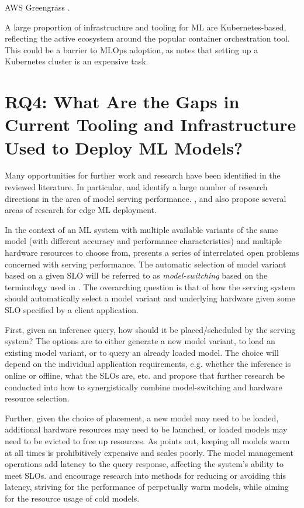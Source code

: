 AWS Greengrass \cite{Krishnamurthi2019}.

A large proportion of infrastructure and tooling for ML are Kubernetes-based, reflecting the active ecosystem around the popular container orchestration tool.
This could be a barrier to MLOps adoption, as \textcite{Ruf2021} notes that setting up a Kubernetes cluster is an expensive task.

\section{RQ4: What Are the Gaps in Current Tooling and Infrastructure Used to Deploy ML Models?}
\label{ch:research_results:rq4_gaps}

Many opportunities for further work and research have been identified in the reviewed literature.
In particular, \cite{Yadwadkar2019} and \cite{Zhang2020} identify a large number of research directions in the area of model serving performance.
\cite{Bosch2021}, \cite{Rausch2019} and \cite{Gupta2020} also propose several areas of research for edge ML deployment.

In the context of an ML system with multiple available variants of the same model (with different accuracy and performance characteristics) and multiple hardware resources to choose from, \cite{Yadwadkar2019} presents a series of interrelated open problems concerned with serving performance.
The automatic selection of model variant based on a given SLO will be referred to as \textit{model-switching} based on the terminology used in \cite{Zhang2020}. 
The overarching question is that of how the serving system should automatically select a model variant and underlying hardware given some SLO specified by a client application.

First, given an inference query, how should it be placed/scheduled by the serving system?
The options are to either generate a new model variant, to load an existing model variant, or to query an already loaded model.
The choice will depend on the individual application requirements, e.g. whether the inference is online or offline, what the SLOs are, etc.
\cite{Yadwadkar2019} and \cite{Zhang2020} propose that further research be conducted into how to synergistically combine model-switching and hardware resource selection.

Further, given the choice of placement, a new model may need to be loaded, additional hardware resources may need to be launched, or loaded models may need to be evicted to free up resources.
As \cite{Zhang2020} points out, keeping all models warm at all times is prohibitively expensive and scales poorly.
The model management operations add latency to the query response, affecting the system's ability to meet SLOs.
\cite{Yadwadkar2019} and \cite{Zhang2020} encourage research into methods for reducing or avoiding this latency, striving for the performance of perpetually warm models, while aiming for the resource usage of cold models.

